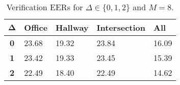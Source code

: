 \begin{table}[h]
    \centering
    \begin{tabular}{|c|M{2cm}|M{2cm}|M{2cm}|M{2cm}|}
    \hline
    $\boldsymbol{\Delta}$ & \bf{Office} & \bf{Hallway} & \bf{Intersection} & \bf{All} \\ 
    \hline 
    \hline
    \bf{0} & 23.68 & 19.32 & 23.84 & 16.09 \\
    \hline
    \bf{1} & 23.42 & 19.33 & 23.45 & 15.39 \\
    \hline
    \bf{2} & 22.49 & 18.40 & 22.49 & 14.62 \\
    \hline
    \end{tabular}
    \caption{Verification EERs for $\Delta \in \{0, 1, 2\}$ and $M = 8$.}
    \label{tab:verify_adapted_mv_M_8}
\end{table}
